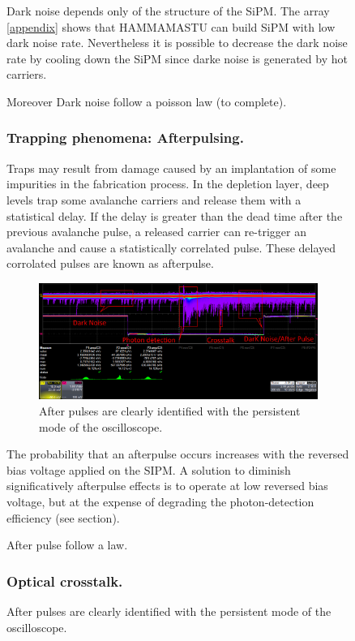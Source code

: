 \begin{figure}[!hbtp]
  Dark noise depends only of the structure of the SiPM. The array \ref{appendix} shows that HAMMAMASTU can build SiPM with low dark noise rate. 
  Nevertheless it is possible to decrease the dark noise rate by cooling down the SiPM since darke noise is generated by 
  hot carriers.  
  
  Moreover Dark noise follow a poisson law (to complete).  
  
  \subsubsection{Trapping phenomena: Afterpulsing.}

  Traps may result from damage caused by an implantation of some impurities in the fabrication process. In the depletion layer, 
  deep levels trap some avalanche carriers and release them with 
  a statistical delay. If the delay is greater than the dead time after the previous avalanche pulse, a released carrier can
  re-trigger an avalanche and cause a statistically correlated pulse. These delayed corrolated pulses are known as afterpulse. 
  \\
  
  \begin{figure}[!hbtp]
  \centering
  \includegraphics[totalheight=0.22\textwidth,trim=0cm 6.5cm 0cm 0cm, clip=true]{Pictures/blabla/DN_AP_CT_1.png}
  \caption{After pulses are clearly identified with the persistent mode of the oscilloscope.}
  \label{fig:AP}
  \end{figure}
  
  The probability that an afterpulse occurs increases with the reversed bias voltage applied on the SIPM.  A solution to diminish 
  significatively afterpulse effects is 
  to operate at low reversed bias voltage, but at the expense of degrading the photon-detection efficiency (see section). 
    
  After pulse follow a law. 
  
  \subsubsection{Optical crosstalk.}
  

\end{figure}
